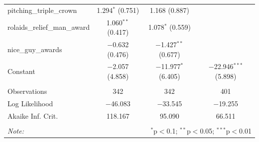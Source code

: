 \documentclass[
]{article}
\begin{document}
\begin{table}[H]
\begin{tabular}{@{\extracolsep{5pt}}lccc}
  pitching\_triple\_crown & 1.294$^{*}$ (0.751) & 1.168 (0.887) &  \\ 
  rolaids\_relief\_man\_award & 1.060$^{**}$ (0.417) & 1.078$^{*}$ (0.559) &  \\ 
  nice\_guy\_awards & $-$0.632 (0.476) & $-$1.427$^{**}$ (0.677) &  \\ 
  Constant & $-$2.057 (4.858) & $-$11.977$^{*}$ (6.405) & $-$22.946$^{***}$ (5.898) \\ 
 \hline \\[-1.8ex] 
Observations & 342 & 342 & 401 \\ 
Log Likelihood & $-$46.083 & $-$33.545 & $-$19.255 \\ 
Akaike Inf. Crit. & 118.167 & 95.090 & 66.511 \\ 
\hline 
\hline \\[-1.8ex] 
\textit{Note:}  & \multicolumn{3}{r}{$^{*}$p$<$0.1; $^{**}$p$<$0.05; $^{***}$p$<$0.01} \\ 
\end{tabular} 
\end{table}
\end{document}
